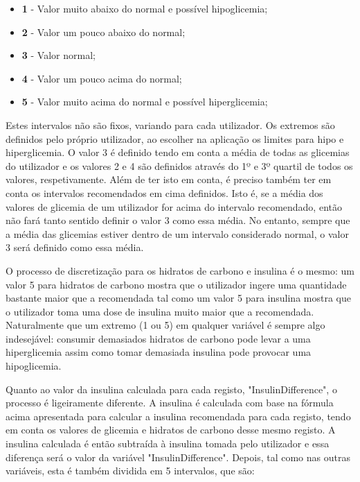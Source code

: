 \begin{itemize}
\item \textbf{1} - Valor muito abaixo do normal e possível hipoglicemia;
\item \textbf{2} - Valor um pouco abaixo do normal;
\item \textbf{3} - Valor normal;
\item \textbf{4} - Valor um pouco acima do normal;
\item \textbf{5} - Valor muito acima do normal e possível hiperglicemia;
\end{itemize}

Estes intervalos não são fixos, variando para cada utilizador. Os extremos são definidos pelo próprio utilizador, ao escolher na aplicação os limites para hipo e hiperglicemia. O valor 3 é definido tendo em conta a média de todas as glicemias do utilizador e os valores 2 e 4 são definidos através do 1º e 3º quartil de todos os valores, respetivamente. Além de ter isto em conta, é preciso também ter em conta os intervalos recomendados em cima definidos. Isto é, se a média dos valores de glicemia de um utilizador for acima do intervalo recomendado, então não fará tanto sentido definir o valor 3 como essa média. No entanto, sempre que a média das glicemias estiver dentro de um intervalo considerado normal, o valor 3 será definido como essa média.

O processo de discretização para os hidratos de carbono e insulina é o mesmo: um valor 5 para hidratos de carbono mostra que o utilizador ingere uma quantidade bastante maior que a recomendada tal como um valor 5 para insulina mostra que o utilizador toma uma dose de insulina muito maior que a recomendada. Naturalmente que um extremo (1 ou 5) em qualquer variável é sempre algo indesejável: consumir demasiados hidratos de carbono pode levar a uma hiperglicemia assim como tomar demasiada insulina pode provocar uma hipoglicemia.

Quanto ao valor da insulina calculada para cada registo, "Insulin\textunderscore Difference", o processo é ligeiramente diferente. A insulina é calculada com base na fórmula acima apresentada para calcular a insulina recomendada para cada registo, tendo em conta os valores de glicemia e hidratos de carbono desse mesmo registo. A insulina calculada é então subtraída à insulina tomada pelo utilizador e essa diferença será o valor da variável "Insulin\textunderscore Difference". Depois, tal como nas outras variáveis, esta é também dividida em 5 intervalos, que são:

